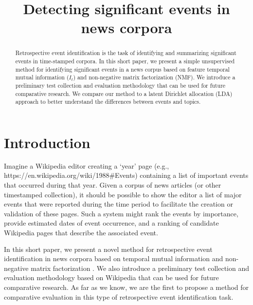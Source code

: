 \documentclass{sig-alternate}
\begin{document}
%

\title{Detecting significant events in news corpora}

\maketitle
\begin{abstract}
Retrospective event identification is the task of identifying and summarizing significant events in time-stamped corpora. In this short paper, we present a simple unsupervised method for identifying significant events in a news corpus based on feature temporal mutual information ($I_t$) and non-negative matrix factorization (NMF). We introduce a preliminary test collection and evaluation methodology that can be used for future comparative research. We compare our method to a latent Dirichlet allocation (LDA) approach to better understand the differences between events and topics.

\end{abstract}


\terms{}


\section{Introduction}

Imagine a Wikipedia editor creating a `year' page (e.g., https://en.wikipedia.org/wiki/1988\#Events) containing a list of important events that occurred during that year. Given a corpus of news articles (or other timestamped collection), it should be possible to show the editor a list of major events that were reported during the time period to facilitate the creation or validation of these pages. Such a system might rank the events by importance, provide estimated dates of event occurrence, and a ranking of candidate Wikipedia pages that describe the associated event. 

In this short paper, we present a novel method for retrospective event identification in news corpora based on temporal mutual information \cite{Teng2008} and non-negative matrix factorization \cite{Lee2001}. We also introduce a preliminary test collection and evaluation methodology based on Wikipedia that can be used for future comparative research.  As far as we know, we are the first to propose a method for comparative evaluation in this type of retrospective event identification task.
\end{document}
